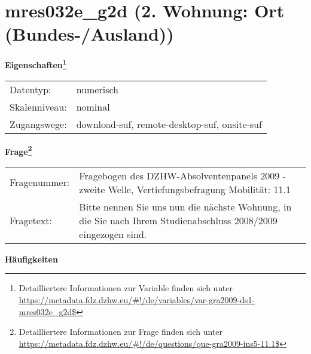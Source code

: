 
    \setcounter{footnote}{0}

    \vspace*{-1.8cm}
	\section{mres032e\_g2d (2. Wohnung: Ort (Bundes-/Ausland))}
	\label{section:mres032e_g2d}



    \vspace*{0.5cm}
    \noindent\textbf{Eigenschaften\footnote{Detailliertere Informationen zur Variable finden sich unter
		\url{https://metadata.fdz.dzhw.eu/\#!/de/variables/var-gra2009-ds1-mres032e_g2d$}}}\\
	\begin{tabularx}{\hsize}{@{}lX}
	Datentyp: & numerisch \\
	Skalenniveau: & nominal \\
	Zugangswege: &
	  download-suf, 
	  remote-desktop-suf, 
	  onsite-suf
 \\
    \end{tabularx}



				\vspace*{0.5cm}
                \noindent\textbf{Frage\footnote{Detailliertere Informationen zur Frage finden sich unter
		              \url{https://metadata.fdz.dzhw.eu/\#!/de/questions/que-gra2009-ins5-11.1$}}}\\
				\begin{tabularx}{\hsize}{@{}lX}
					Fragenummer: &
					  Fragebogen des DZHW-Absolventenpanels 2009 - zweite Welle, Vertiefungsbefragung Mobilität:
					  11.1
 \\
					Fragetext: & Bitte nennen Sie uns nun die nächste Wohnung, in die Sie nach Ihrem Studienabschluss 2008/2009 eingezogen sind. \\
				\end{tabularx}





        		\vspace*{0.5cm}
                \noindent\textbf{Häufigkeiten}


